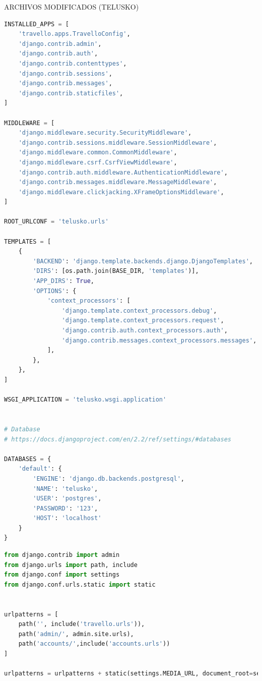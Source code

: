 \documentclass{article}
\begin{document}
        \item ARCHIVOS MODIFICADOS (TELUSKO)
        
        \begin{lstlisting}[language=Python, caption=settings.py]
INSTALLED_APPS = [
    'travello.apps.TravelloConfig',
    'django.contrib.admin',
    'django.contrib.auth',
    'django.contrib.contenttypes',
    'django.contrib.sessions',
    'django.contrib.messages',
    'django.contrib.staticfiles',
]

MIDDLEWARE = [
    'django.middleware.security.SecurityMiddleware',
    'django.contrib.sessions.middleware.SessionMiddleware',
    'django.middleware.common.CommonMiddleware',
    'django.middleware.csrf.CsrfViewMiddleware',
    'django.contrib.auth.middleware.AuthenticationMiddleware',
    'django.contrib.messages.middleware.MessageMiddleware',
    'django.middleware.clickjacking.XFrameOptionsMiddleware',
]

ROOT_URLCONF = 'telusko.urls'

TEMPLATES = [
    {
        'BACKEND': 'django.template.backends.django.DjangoTemplates',
        'DIRS': [os.path.join(BASE_DIR, 'templates')],
        'APP_DIRS': True,
        'OPTIONS': {
            'context_processors': [
                'django.template.context_processors.debug',
                'django.template.context_processors.request',
                'django.contrib.auth.context_processors.auth',
                'django.contrib.messages.context_processors.messages',
            ],
        },
    },
]

WSGI_APPLICATION = 'telusko.wsgi.application'


# Database
# https://docs.djangoproject.com/en/2.2/ref/settings/#databases

DATABASES = {
    'default': {
        'ENGINE': 'django.db.backends.postgresql',
        'NAME': 'telusko',
        'USER': 'postgres',
        'PASSWORD': '123',
        'HOST': 'localhost'
    }
}

        \end{lstlisting}
        
        \begin{lstlisting}[language=Python, caption=urls.py]
from django.contrib import admin
from django.urls import path, include
from django.conf import settings
from django.conf.urls.static import static


urlpatterns = [
    path('', include('travello.urls')),
    path('admin/', admin.site.urls),
    path('accounts/',include('accounts.urls'))
] 

urlpatterns = urlpatterns + static(settings.MEDIA_URL, document_root=settings.MEDIA_ROOT)
        \end{lstlisting}  
\end{document}

